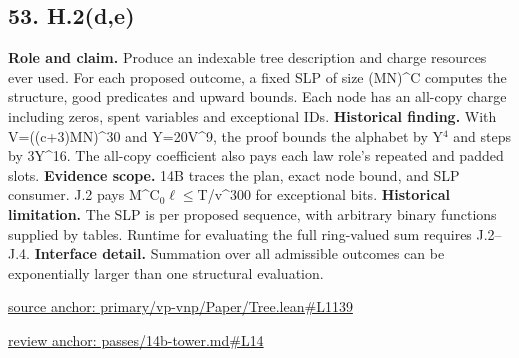 \documentclass[11pt,letterpaper]{article}
\theoremstyle{definition}\newtheorem{definition}[theorem]{Definition}\newtheorem{example}[theorem]{Example}
\theoremstyle{remark}\newtheorem{remark}[theorem]{Remark}
\begin{document}
\subsection*{53. H.2(d,e)}
\textbf{Role and claim.} Produce an indexable tree description and charge resources ever used. For each proposed outcome, a fixed SLP of size (MN)\textasciicircum{}C computes the structure, good predicates and upward bounds. Each node has an all-copy charge including zeros, spent variables and exceptional IDs.
\textbf{Historical finding.} With V=((c+3)MN)\textasciicircum{}30 and Y=20V\textasciicircum{}9, the proof bounds the alphabet by Y\ensuremath{{}^4} and steps by 3Y\textasciicircum{}16. The all-copy coefficient also pays each law role's repeated and padded slots.
\textbf{Evidence scope.} 14B traces the plan, exact node bound, and SLP consumer. J.2 pays M\textasciicircum{}C\ensuremath{{}_0}\ensuremath{\ell}\ensuremath{\le}T/v\textasciicircum{}300 for exceptional bits.
\textbf{Historical limitation.} The SLP is per proposed sequence, with arbitrary binary functions supplied by tables. Runtime for evaluating the full ring-valued sum requires J.2–J.4.
\textbf{Interface detail.} Summation over all admissible outcomes can be exponentially larger than one structural evaluation.
\par\href{https://github.com/nousentllc/VP-VNP-Review/blob/8a7976933b6b2b4ffda1ad3a0dfb5fc6b6f023e8/primary/vp-vnp/Paper/Tree.lean\#L1139}{source anchor: primary/vp-vnp/Paper/Tree.lean\#L1139}
\par\href{https://github.com/nousentllc/VP-VNP-Review/blob/8a7976933b6b2b4ffda1ad3a0dfb5fc6b6f023e8/passes/14b-tower.md\#L14}{review anchor: passes/14b-tower.md\#L14}
\goodbreak
{}
\hypertarget{claim.54}{}
\end{document}
